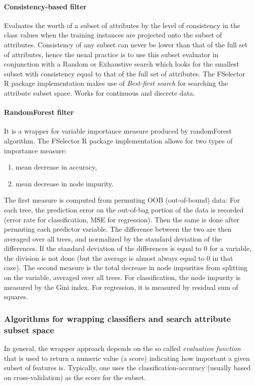 \documentclass[10pt]{article}\usepackage[]{graphicx}\usepackage[]{color}
\begin{document}
\paragraph{Consistency-based filter}
Evaluates the worth of a subset of attributes by the level of consistency in the class values when the training instances are projected onto the subset of attributes. Consistency of any subset can never be lower than that of the full set of attributes, hence the usual practice is to use this subset evaluator in conjunction with a Random or Exhaustive search which looks for the smallest subset with consistency equal to that of the full set of attributes. The FSelector R package implementation makes use of \textit{Best-first search} for searching the attribute subset space. Works for continuous and discrete data.

\paragraph{RandomForest filter}
It is a wrapper for variable importance measure produced by randomForest algorithm. The FSelector R package implementation allows for two types of importance measure:
\begin{enumerate}
\item mean decrease in accuracy,
\item mean decrease in node impurity.
\end{enumerate}
The first measure is computed from
permuting OOB (out-of-bound) data: For each tree, the prediction error on the out-of-bag portion of the data is recorded (error rate for classification, MSE for regression). Then the same is done after permuting each predictor variable. The difference between the two are then averaged over all trees, and normalized by the standard deviation of the differences. If the standard deviation of the differences is equal to 0 for a variable, the division is not done (but the average is almost always equal to 0 in that case).
\newline
The second measure is the total decrease in node impurities from splitting on the variable, averaged over all trees. For classification, the node impurity is measured by the Gini index. For regression, it is measured by residual sum of squares.


\clearpage
\subsubsection{Algorithms for wrapping classifiers and search attribute subset space}
In general, the wrapper approach depends on the so called \textit{evaluation function} that is used to return a numeric value (a score) indicating how important a given subset of features is. Typically, one uses the classification-accuracy (usually based on cross-validation) as the score for the subset. 
\end{document}
